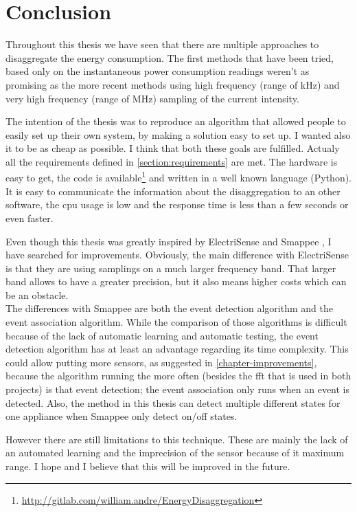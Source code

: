 \chapter{Conclusion}
Throughout this thesis we have seen that there are multiple approaches to disaggregate the energy consumption. The first methods that have been tried, based only on the instantaneous power consumption readings weren't as promising as the more recent methods using high frequency (range of kHz) and very high frequency (range of MHz) sampling of the current intensity.

The intention of the thesis was to reproduce an algorithm that allowed people to easily set up their own system, by making a solution easy to set up. I wanted also it to be as cheap as possible. I think that both these goals are fulfilled. Actualy all the requirements defined in \autoref{section:requirements} are met. The hardware is easy to get, the code is available\footnote{\url{http://gitlab.com/william.andre/EnergyDisaggregation}} and written in a well known language (Python). It is easy to communicate the information about the disaggregation to an other software, the \acrshort{cpu} usage is low and the response time is less than a few seconds or even faster.

Even though this thesis was greatly inspired by ElectriSense \cite{gupta2010electrisense} and Smappee \cite{bruneel2018energy}, I have searched for improvements. Obviously, the main difference with ElectriSense is that they are using samplings on a much larger frequency band. That larger band allows to have a greater precision, but it also means higher costs which can be an obstacle.\\
The differences with Smappee are both the event detection algorithm and the event association algorithm. While the comparison of those algorithms is difficult because of the lack of automatic learning and automatic testing, the event detection algorithm has at least an advantage regarding its time complexity. This could allow putting more sensors, as suggested in \autoref{chapter-improvements}, because the algorithm running the more often (besides the \acrshort{fft} that is used in both projects) is that event detection; the event association only runs when an event is detected. Also, the method in this thesis can detect multiple different states for one appliance when Smappee only detect on/off states.

However there are still limitations to this technique. These are mainly the lack of an automated learning and the imprecision of the sensor because of it maximum range. I hope and I believe that this will be improved in the future.